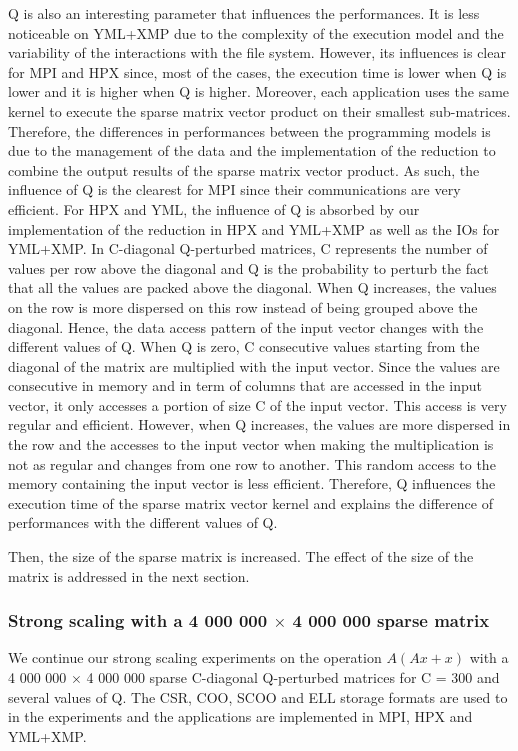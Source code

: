 Q is also an interesting parameter that influences the performances.
It is less noticeable on YML+XMP due to the complexity of the execution model and the variability of the interactions with the file system.
However, its influences is clear for MPI and HPX since, most of the cases, the execution time is lower when Q is lower and it is higher when Q is higher.
Moreover, each application uses the same kernel to execute the sparse matrix vector product on their smallest sub-matrices.
Therefore, the differences in performances between the programming models is due to the management of the data and the implementation of the reduction to combine the output results of the sparse matrix vector product.
As such, the influence of Q is the clearest for MPI since their communications are very efficient.
For HPX and YML, the influence of Q is absorbed by our implementation of the reduction in HPX and YML+XMP as well as the IOs for YML+XMP.
In C-diagonal Q-perturbed matrices, C represents the number of values per row above the diagonal and Q is the probability to perturb the fact that all the values are packed above the diagonal.
When Q increases, the values on the row is more dispersed on this row instead of being grouped above the diagonal.
Hence, the data access pattern of the input vector changes with the different values of Q.
When Q is zero, C consecutive values starting from the diagonal of the matrix are multiplied with the input vector.
Since the values are consecutive in memory and in term of columns that are accessed in the input vector, it only accesses a portion of size C of the input vector.
This access is very regular and efficient.
However, when Q increases, the values are more dispersed in the row and the accesses to the input vector when making the multiplication is not as regular and changes from one row to another.
This random access to the memory containing the input vector is less efficient.
Therefore, Q influences the execution time of the sparse matrix vector kernel and explains the difference of performances with the different values of Q.

Then, the size of the sparse matrix is increased.
The effect of the size of the matrix is addressed in the next section.

\subsubsection{Strong scaling with a 4 000 000 $\times$ 4 000 000 sparse matrix}
We continue our strong scaling experiments on the operation $A(Ax+x)$ with a 4 000 000 $\times$ 4 000 000 sparse C-diagonal Q-perturbed matrices for C = 300 and several values of Q.
The CSR, COO, SCOO and ELL storage formats are used to in the experiments and the applications are implemented in MPI, HPX and YML+XMP.

